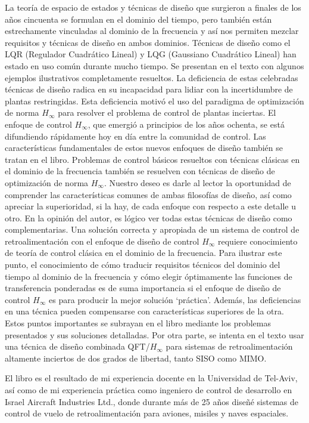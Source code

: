 \documentclass[
	spanish, %
	letterpaper, oneside
]{book}
\begin{document}
\begin{abstractd}
	La teoría de espacio de estados y técnicas de diseño que surgieron a finales de los años cincuenta se formulan en el dominio del tiempo, pero también están estrechamente vinculadas al dominio de la frecuencia y así nos permiten mezclar requisitos y técnicas de diseño en ambos dominios. Técnicas de diseño como el LQR (Regulador Cuadrático Lineal) y LQG (Gaussiano Cuadrático Lineal) han estado en uso común durante mucho tiempo. Se presentan en el texto con algunos ejemplos ilustrativos completamente resueltos. La deficiencia de estas celebradas técnicas de diseño radica en su incapacidad para lidiar con la incertidumbre de plantas restringidas. Esta deficiencia motivó el uso del paradigma de optimización de norma $H_{\infty}$ para resolver el problema de control de plantas inciertas. El enfoque de control $H_{\infty}$, que emergió a principios de los años ochenta, se está difundiendo rápidamente hoy en día entre la comunidad de control. Las características fundamentales de estos nuevos enfoques de diseño también se tratan en el libro. Problemas de control básicos resueltos con técnicas clásicas en el dominio de la frecuencia también se resuelven con técnicas de diseño de optimización de norma $H_{\infty}$. Nuestro deseo es darle al lector la oportunidad de comprender las características comunes de ambas filosofías de diseño, así como apreciar la superioridad, si la hay, de cada enfoque con respecto a este detalle u otro. En la opinión del autor, es lógico ver todas estas técnicas de diseño como complementarias. Una solución correcta y apropiada de un sistema de control de retroalimentación con el enfoque de diseño de control $H_{\infty}$ requiere conocimiento de teoría de control clásica en el dominio de la frecuencia. Para ilustrar este punto, el conocimiento de cómo traducir requisitos técnicos del dominio del tiempo al dominio de la frecuencia y cómo elegir óptimamente las funciones de transferencia ponderadas es de suma importancia si el enfoque de diseño de control $H_{\infty}$ es para producir la mejor solución `práctica'. Además, las deficiencias en una técnica pueden compensarse con características superiores de la otra. Estos puntos importantes se subrayan en el libro mediante los problemas presentados y sus soluciones detalladas. Por otra parte, se intenta en el texto usar una técnica de diseño combinada QFT/$H_{\infty}$ para sistemas de retroalimentación altamente inciertos de dos grados de libertad, tanto SISO como MIMO.

	El libro es el resultado de mi experiencia docente en la Universidad de Tel-Aviv, así como de mi experiencia práctica como ingeniero de control de desarrollo en Israel Aircraft Industries Ltd., donde durante más de 25 años diseñé sistemas de control de vuelo de retroalimentación para aviones, misiles y naves espaciales.


\end{abstractd}
\end{document}
